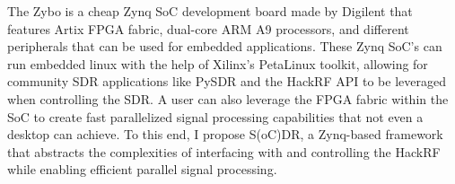 \documentclass[conference]{IEEEtran}
\begin{document}
The Zybo is a cheap Zynq SoC development board made by Digilent that features Artix FPGA fabric, dual-core ARM A9 processors, 
and different peripherals that can be used for embedded applications. These Zynq SoC’s can run embedded linux with the help of Xilinx’s PetaLinux toolkit, 
allowing for community SDR applications like PySDR and the HackRF API to be leveraged when controlling the SDR. A user can also leverage the FPGA fabric within the 
SoC to create fast parallelized signal processing capabilities that not even a desktop can achieve. 
To this end, I propose S(oC)DR, a Zynq-based framework that abstracts the complexities of interfacing with and 
controlling the HackRF while enabling efficient parallel signal processing.

\nocite{*}

\end{document}
